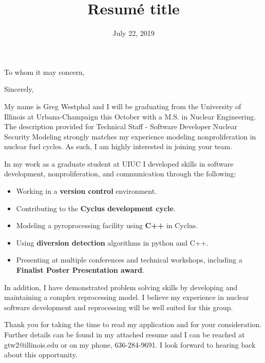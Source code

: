 \documentclass[11pt,a4paper,sans]{moderncv}        %
\title{Resumé title}                               %
\begin{document}
\vspace{2mm}
\hline
{}
\date{July 22, 2019}
\opening{To whom it may concern,}
\closing{Sincerely,}
\makelettertitle

My name is Greg Westphal and I will be graduating from the University of Illinois at 
Urbana-Champaign this October with a M.S. in Nuclear Engineering. The description provided for 
Technical Staff - Software Developer Nuclear Security Modeling strongly matches my experience  modeling nonproliferation in nuclear fuel cycles. As such, I am highly interested in joining your team.

In my work as a graduate student at UIUC I developed skills in software development, nonproliferation, and communication through the following:
\vspace{2mm}
\begin{itemize}
	\item Working in a \textbf{version control} environment.\vspace{2mm}
	\item Contributing to the \textbf{Cyclus development cycle}.\vspace{2mm}
	\item Modeling a pyroprocessing facility using \textbf{C++} in Cyclus.\vspace{2mm}
	\item Using \textbf{diversion detection} algorithms in python and C++.\vspace{2mm}
	\item Presenting at multiple conferences and technical workshops, including a \textbf{Finalist Poster
	Presentation award}.
\end{itemize}

In addition, I have demonstrated problem solving skills by developing and maintaining
a complex reprocessing model. 
I believe my experience in nuclear software development and reprocessing will be
well suited for this group. 

Thank you for taking the time to read my application and for your consideration.
Further details can be found in my attached resume and I can be reached at gtw2@illinois.edu
or on my phone, 636-284-9691. I look forward to hearing back about this opportunity.

\makeletterclosing
\end{document}
